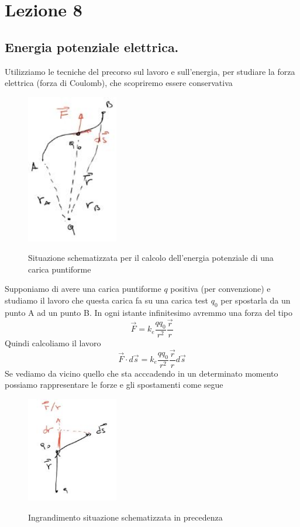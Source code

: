 
\chapter{Lezione 8}
\section{Energia potenziale elettrica.}

Utilizziamo le tecniche del precorso sul lavoro e sull'energia, per studiare la forza elettrica (forza di Coulomb), che scopriremo essere conservativa
\begin{figure}[h]
	\begin{center}
		\includegraphics[width=4cm]{lezione8/images/1 Elettrostatica, Il potenziale elettrico}\\
		\caption{Situazione schematizzata per il calcolo dell'energia potenziale di una carica puntiforme}
	\end{center}
\end{figure}

Supponiamo di avere una carica puntiforme $q$ positiva (per convenzione) e studiamo il lavoro che questa carica fa su una carica test $q_0$ per spostarla da un punto A ad un punto B. In ogni istante infinitesimo avremmo una forza del tipo 
$$\vec{F}=k_e \frac{qq_0}{r^2}\frac{\vec{r}}{r}$$
Quindi calcoliamo il lavoro
$$\vec{F}\cdot d\vec{s}=k_e  \frac{qq_0}{r^2}\frac{\vec{r}}{r}d\vec{s}$$
Se vediamo da vicino quello che sta acccadendo in un determinato momento possiamo rappresentare le forze e gli spostamenti come segue

\begin{figure}[h]
	\begin{center}
		\includegraphics[width=4cm]{lezione8/images/2 Elettrostatica, Il potenziale elettrico}\\
		\caption{Ingrandimento situazione schematizzata in precedenza}
	\end{center}
\end{figure}

